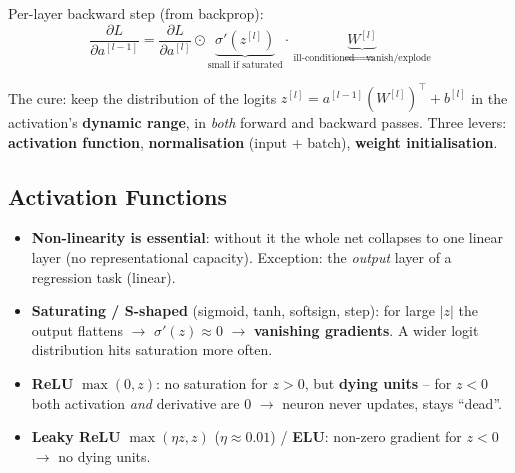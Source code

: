 \documentclass[10pt,a4paper]{article}
\begin{document}
	\begin{formulabox}
		Per-layer backward step (from backprop):
		\[
		\frac{\partial L}{\partial a^{[l-1]}} = \frac{\partial L}{\partial a^{[l]}}\odot \underbrace{\sigma'(z^{[l]})}_{\text{small if saturated}}\cdot\, \underbrace{W^{[l]}}_{\text{ill-conditioned}\Rightarrow\,\text{vanish/explode}}
		\]
	\end{formulabox}
	\begin{importantbox}
		The cure: keep the distribution of the logits $z^{[l]}=a^{[l-1]}(W^{[l]})^{\top}+b^{[l]}$ in the activation's \textbf{dynamic range}, in \emph{both} forward and backward passes. Three levers: \textbf{activation function}, \textbf{normalisation} (input + batch), \textbf{weight initialisation}.
	\end{importantbox}

	\subsection{Activation Functions}

	\begin{itemize}[leftmargin=*]
		\item \textbf{Non-linearity is essential}: without it the whole net collapses to one linear layer (no representational capacity). Exception: the \emph{output} layer of a regression task (linear).
		\item \textbf{Saturating / S-shaped} (sigmoid, tanh, softsign, step): for large $|z|$ the output flattens $\rightarrow$ $\sigma'(z)\approx0$ $\rightarrow$ \textbf{vanishing gradients}. A wider logit distribution hits saturation more often.
		\item \textbf{ReLU} $\max(0,z)$: no saturation for $z>0$, but \textbf{dying units} -- for $z<0$ both activation \emph{and} derivative are $0$ $\rightarrow$ neuron never updates, stays ``dead''.
		\item \textbf{Leaky ReLU} $\max(\eta z, z)$ ($\eta\approx0.01$) / \textbf{ELU}: non-zero gradient for $z<0$ $\rightarrow$ no dying units.
	\end{itemize}
\end{document}

